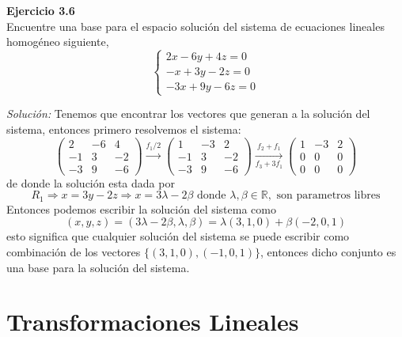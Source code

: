 \documentclass{article}
\newenvironment{problem}[2][Ejercicio]
    { \begin{mdframed}[backgroundcolor=gray!20] \textbf{#1 #2} \\}
    {  \end{mdframed}}
\newenvironment{solution}
    {\textit{Solución:}}
    {}
\begin{document}
\begin{problem}{3.6}
    Encuentre una base para el espacio solución del sistema de ecuaciones lineales homogéneo siguiente,
\[
\begin{cases}
2x-6y+4z = 0 \\
-x+3y-2z = 0 \\
-3x+9y-6z = 0
\end{cases}
\]
\end{problem}
\begin{solution}
    Tenemos que encontrar los vectores que generan a la solución del sistema, entonces primero resolvemos el sistema:
\[
\begin{pmatrix}
2 & -6 &4 \\
-1 & 3 & -2 \\
-3 & 9 & -6
\end{pmatrix} \xrightarrow{f_1/2}
\begin{pmatrix}
1 & -3 &2 \\
-1 & 3 & -2 \\
-3 & 9 & -6
\end{pmatrix} \xrightarrow[f_3+3f_1]{f_2+f_1}
\begin{pmatrix}
1 & -3 &2 \\
0 & 0 & 0 \\
0 & 0 & 0
\end{pmatrix}
\]
de donde la solución esta dada por
\[
R_1 \Rightarrow x = 3y - 2z \Rightarrow x = 3\lambda - 2\beta \text{ donde } \lambda,\beta \in \mathbb{R},\text{ son parametros libres}
\]
Entonces podemos escribir la solución del sistema como
\[
(x, y, z) = (3\lambda - 2\beta, \lambda, \beta) = \lambda(3, 1, 0) + \beta(-2, 0, 1)
\]
esto significa que cualquier solución del sistema se puede escribir como combinación de los vectores $\{ (3,1,0), (-1,0,1)  \}$, entonces dicho conjunto es una base para la solución del sistema.
\end{solution}

\section{Transformaciones Lineales}\label{sec:trans-lineales}
\end{document}
